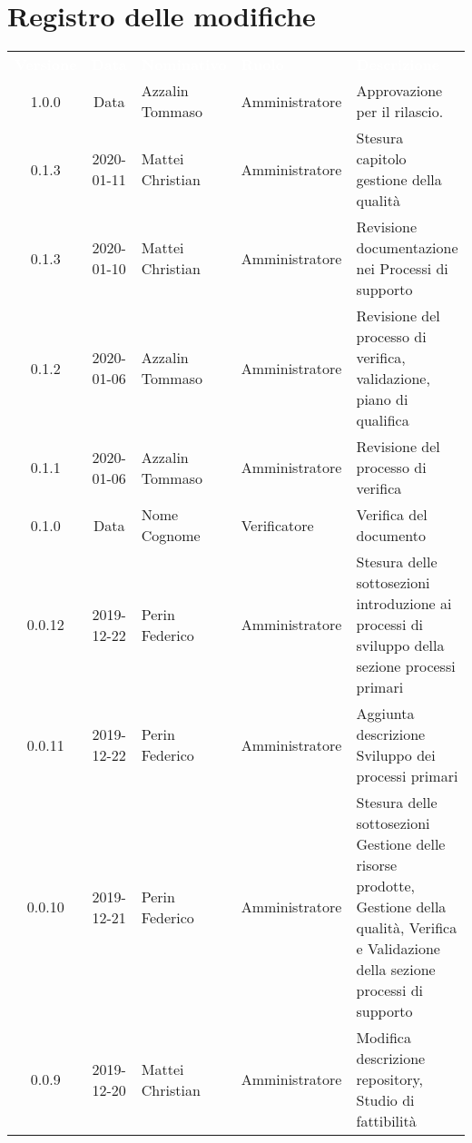 \section*{Registro delle modifiche}
{
\renewcommand{\arraystretch}{1.5}
\centering
\begin{longtable}{c c  C{4cm}  C{3cm} C{4cm}}
\textcolor{white}{\textbf{Versione}} & \textcolor{white}{\textbf{Data}} & \textcolor{white}{\textbf{Nominativo}} & \textcolor{white}{\textbf{Ruolo}} & \textcolor{white}{\textbf{Descrizione}}\\	


1.0.0 & Data & Azzalin Tommaso & Amministratore & Approvazione per il rilascio.  \\


0.1.3 & 2020-01-11 & Mattei Christian & Amministratore & Stesura capitolo gestione della qualità \\

0.1.3 & 2020-01-10 & Mattei Christian & Amministratore & Revisione documentazione nei Processi di supporto \\

0.1.2 & 2020-01-06 & Azzalin Tommaso & Amministratore & Revisione del processo di verifica, validazione, piano di qualifica \\

0.1.1 & 2020-01-06 & Azzalin Tommaso & Amministratore & Revisione del processo di verifica \\

0.1.0 & Data & Nome Cognome & Verificatore & Verifica del documento \\

0.0.12 & 2019-12-22 & Perin Federico & Amministratore & Stesura delle sottosezioni introduzione ai processi di sviluppo della sezione processi primari\\

0.0.11 & 2019-12-22 & Perin Federico  & Amministratore & Aggiunta descrizione Sviluppo dei processi primari \\

0.0.10 & 2019-12-21 & Perin Federico & Amministratore & Stesura delle sottosezioni Gestione delle risorse prodotte, Gestione della qualità, Verifica e Validazione della sezione processi di supporto \\

0.0.9 & 2019-12-20 & Mattei Christian & Amministratore & Modifica descrizione repository, Studio di fattibilità \\


\end{longtable}}
